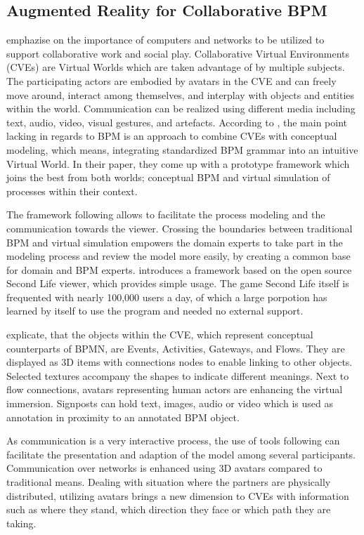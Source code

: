	
	\subsection{Augmented Reality for Collaborative BPM}

	 emphazise on the importance of computers and networks to be utilized to support collaborative work 
	and social play. Collaborative Virtual Environments (CVEs) are Virtual Worlds which are taken advantage of by multiple
	subjects. The participating actors are embodied by avatars in the CVE and can freely move around, interact among themselves,
	and interplay with objects and entities within the world. Communication can be realized using different media including
	text, audio, video, visual gestures, and artefacts. According to , the main point lacking in regards to
	BPM is an approach to combine CVEs with conceptual modeling, which means, integrating standardized BPM grammar into an
	intuitive Virtual World. In their paper, they come up with a prototype framework which joins the best from both worlds;
	conceptual BPM and virtual simulation of processes within their context.
	
	The framework following  allows to facilitate the process modeling and the communication towards
	the viewer. Crossing the boundaries between traditional BPM and virtual simulation empowers the domain experts to
	take part in the modeling process and review the model more easily, by creating a common base for domain and BPM experts.
	 introduces a framework based on the open source Second Life viewer, which provides simple usage. 
	The game Second Life itself is frequented with nearly 100,000 users a day, of which a large porpotion has learned 
	by itself to use the program and needed no external support.
	
	 explicate, that the objects within the CVE, which represent conceptual counterparts of BPMN, are Events, Activities,
	Gateways, and Flows. They are displayed as 3D items with connections nodes to enable linking to other objects. Selected
	textures accompany the shapes to indicate different meanings. Next to flow connections, avatars representing
	human actors are enhancing the virtual immersion. Signposts can hold text, images, audio or video which is used 
	as annotation in proximity to an annotated BPM object.
	
	As communication is a very interactive process, the use of tools following  can facilitate the 
	presentation and adaption of the model among several participants. Communication over networks is enhanced using
	3D avatars compared to traditional means. Dealing with situation where the partners are physically distributed,
	utilizing avatars brings a new dimension to CVEs with information such as where they stand, which direction they 
	face or which path they are taking.
	
